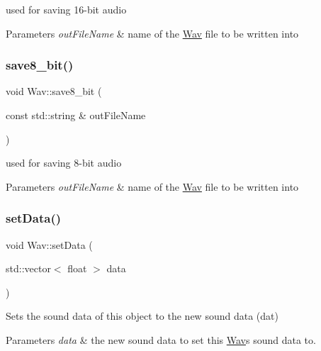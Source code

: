 used for saving 16-\/bit audio 
\begin{DoxyParams}{Parameters}
{\em out\+File\+Name} & name of the \hyperlink{classWav}{Wav} file to be written into \\
\hline
\end{DoxyParams}
\mbox{\label{classWav_a66847ec05647a0d091c23b789d2838e1}} 
\subsubsection{\texorpdfstring{save8\+\_\+bit()}{save8\_bit()}}
{\footnotesize\ttfamily void Wav\+::save8\+\_\+bit (\begin{DoxyParamCaption}\item[{const std\+::string \&}]{out\+File\+Name }\end{DoxyParamCaption})}

used for saving 8-\/bit audio 
\begin{DoxyParams}{Parameters}
{\em out\+File\+Name} & name of the \hyperlink{classWav}{Wav} file to be written into \\
\hline
\end{DoxyParams}
\mbox{\label{classWav_a7e0568b73367b2ea5033b6b1339e4102}} 
\subsubsection{\texorpdfstring{set\+Data()}{setData()}}
{\footnotesize\ttfamily void Wav\+::set\+Data (\begin{DoxyParamCaption}\item[{std\+::vector$<$ float $>$}]{data }\end{DoxyParamCaption})}

Sets the sound data of this object to the new sound data (dat) 
\begin{DoxyParams}{Parameters}
{\em data} & the new sound data to set this \hyperlink{classWav}{Wav}\textquotesingle{}s sound data to. \\
\hline
\end{DoxyParams}
\mbox{\label{classWav_acff4451463630b5ddb1a31e43cbab95e}} 
